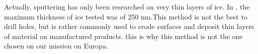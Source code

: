 Actually, sputtering has only been researched on very thin layers of ice. In \cite{baragiola2003sputtering}, the maximum thickness of ice tested was of 250 nm.This method is not the best to drill holes, but is rather commonly used to erode surfaces and deposit thin layers of material on manufactured products. this is why this method is not the one chosen on our mission on Europa.